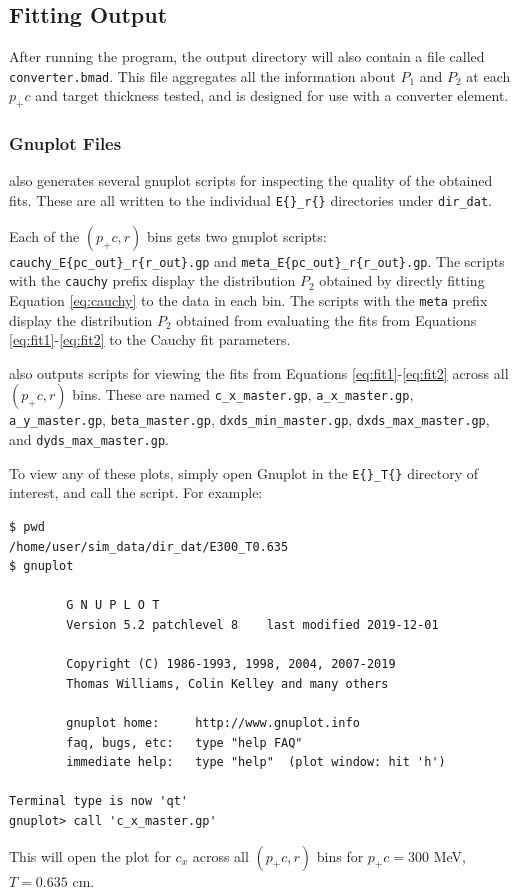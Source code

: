 \documentclass[12pt]{article}
\begin{document}
\subsection{Fitting Output}

After running the \exef  program, the output directory will also contain a file called \texttt{converter.bmad}.
This file aggregates all the information about $P_1$ and $P_2$ at each $p_+ c$ and target thickness tested, and is designed for use with a \bmad  converter element.

\subsubsection{Gnuplot Files}

\exef  also generates several gnuplot scripts for inspecting the quality of the obtained fits.
These are all written to the individual \texttt{E\{\}\_r\{\}} directories under \texttt{dir\_dat}.

Each of the $(p_+ c, r)$ bins gets two gnuplot scripts:
\texttt{cauchy\_E\{pc\_out\}\_r\{r\_out\}.gp} and \texttt{meta\_E\{pc\_out\}\_r\{r\_out\}.gp}.  The
scripts with the \texttt{cauchy} prefix display the distribution $P_2$ obtained by directly fitting
Equation \ref{eq:cauchy} to the data in each bin.  The scripts with the \texttt{meta} prefix display
the distribution $P_2$ obtained from evaluating the fits from Equations \ref{eq:fit1}-\ref{eq:fit2}
to the Cauchy fit parameters.

\exef  also outputs scripts for viewing the fits from Equations \ref{eq:fit1}-\ref{eq:fit2} across all $(p_+ c, r)$ bins.
These are named \texttt{c\_x\_master.gp},
\texttt{a\_x\_master.gp},
\texttt{a\_y\_master.gp},
\texttt{beta\_master.gp},
\texttt{dxds\_min\_master.gp},
\texttt{dxds\_max\_master.gp},
and \texttt{dyds\_max\_master.gp}.

To view any of these plots, simply open Gnuplot in the \texttt{E\{\}\_T\{\}} directory of interest, and call the script.
For example:
\begin{verbatim}
$ pwd
/home/user/sim_data/dir_dat/E300_T0.635
$ gnuplot

        G N U P L O T
        Version 5.2 patchlevel 8    last modified 2019-12-01

        Copyright (C) 1986-1993, 1998, 2004, 2007-2019
        Thomas Williams, Colin Kelley and many others

        gnuplot home:     http://www.gnuplot.info
        faq, bugs, etc:   type "help FAQ"
        immediate help:   type "help"  (plot window: hit 'h')

Terminal type is now 'qt'
gnuplot> call 'c_x_master.gp'
\end{verbatim}
This will open the plot for $c_x$ across all $(p_+ c, r)$ bins for $p_+ c = 300$ MeV, $T = 0.635$ cm.
\end{document}
